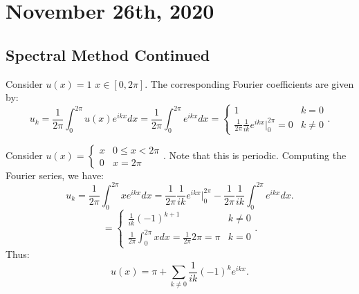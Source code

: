 \documentclass[../main/main.tex]{subfiles}
\begin{document}
\section{November 26th, 2020}
\subsection{Spectral Method Continued}
\begin{example}
    Consider $u(x) = 1$  $x \in [0,2\pi]$. The corresponding Fourier coefficients are given by: \[
        u_k = \frac{1}{2\pi}\int^{2\pi}_0 u(x) e^{ikx}dx = \frac{1}{2\pi} \int ^{2\pi}_0 e^{ikx}dx = \begin{cases}
            1 & k=0 \\
        \frac{1}{2\pi} \frac{1}{ik}e^{ikx}\bigg\rvert ^{2\pi}_0 = 0 & k\neq 0
        \end{cases}
    .\] 
\end{example}
\begin{example}
    Consider $u(x) = \begin{cases}
        x & 0 \le x < 2\pi \\
        0 & x=2\pi
    \end{cases}$. Note that this is periodic. Computing the Fourier series, we have: \[
u_k = \frac{1}{2\pi} \int ^{2\pi}_0 x e^{ikx}dx = \frac{1}{2\pi} \frac{1}{ik}e^{ikx}\bigg\rvert ^{2\pi}_0 - \frac{1}{2\pi} \frac{1}{ik} \int ^{2\pi}_0 e^{ikx}dx 
    .\] \[
    =\begin{cases}
        \frac{1}{ik} (-1)^{k+1} & k\neq 0 \\
         \frac{1}{2\pi}\int ^{2\pi}_0 xdx = \frac{1}{2\pi} 2\pi = \pi & k = 0 \end{cases}
    .\] 
    Thus: \[
        u(x) = \pi + \sum_{k\neq 0} \frac{1}{ik}(-1)^{k}e^{ikx}
    .\] 
\end{example}
\end{document}
